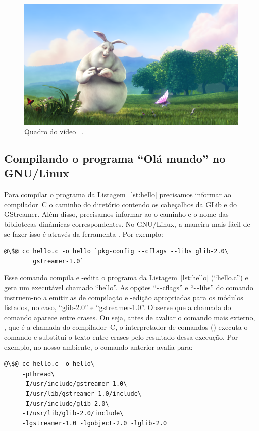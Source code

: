 \documentclass{SBCbookchapter}
\begin{document}
\begin{figure}[H]
  \centering
  \includegraphics[scale=.115]{media/frame}
  \caption{Quadro do vídeo ~\cite{bunny}.}
  \label{fig:bunny}
\end{figure}


\subsection*{Compilando o programa ``Olá mundo'' no GNU/Linux}

Para compilar o programa da Listagem~\ref{lst:hello} precisamos informar ao
compilador~C o caminho do diretório contendo os cabeçalhos da GLib e do
GStreamer.  Além disso, precisamos informar ao  o caminho e o
nome das bibliotecas dinâmicas correspondentes.  No GNU/Linux, a maneira
mais fácil de se fazer isso é através da ferramenta .  Por
exemplo:
\begin{lstlisting}[style=command]
@\$@ cc hello.c -o hello `pkg-config --cflags --libs glib-2.0\
        gstreamer-1.0`
\end{lstlisting}

Esse comando compila e -edita o programa da
Listagem~\ref{lst:hello} (``hello.c'') e gera um executável chamado
``hello''.  As opções ``-\,-cflags'' e ``-\,-libs'' do comando
 instruem-no a emitir as  de compilação e
\en{link}-edição apropriadas para os módulos listados, no caso, ``glib-2.0'' e
``gstreamer-1.0''.  Observe que a chamada do comando \en{pkg-config} aparece
entre crases.  Ou seja, antes de avaliar o comando mais externo, \en{cc},
que é a chamada do compilador~C, o interpretador de comandos (\en{shell})
executa o comando \en{pkg-config} e substitui o texto entre crases pelo
resultado dessa execução.  Por exemplo, no nosso ambiente, o comando anterior
avalia para:
\begin{lstlisting}[style=command]
@\$@ cc hello.c -o hello\
     -pthread\
     -I/usr/include/gstreamer-1.0\
     -I/usr/lib/gstreamer-1.0/include\
     -I/usr/include/glib-2.0\
     -I/usr/lib/glib-2.0/include\
     -lgstreamer-1.0 -lgobject-2.0 -lglib-2.0
\end{lstlisting}
\end{document}
